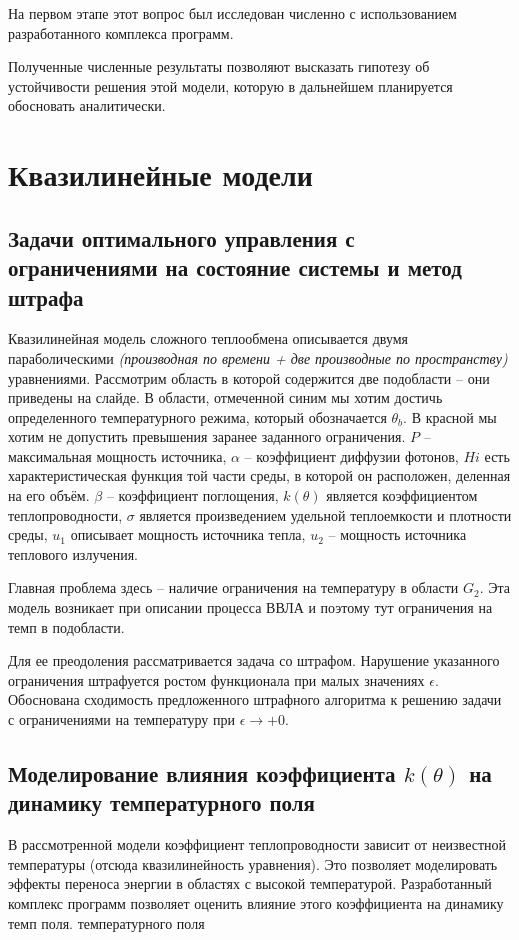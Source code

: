 \documentclass[8pt,a4paper]{article}
\begin{document}
    На первом этапе этот вопрос был исследован численно с использованием
    разработанного комплекса программ.

    Полученные численные результаты позволяют высказать гипотезу
    об устойчивости решения этой модели, которую в дальнейшем планируется обосновать аналитически.


    \section*{Квазилинейные модели}
    \subsection*{Задачи оптимального управления с ограничениями на состояние системы и метод штрафа}
    Квазилинейная модель сложного теплообмена описывается двумя параболическими
    \textit{(производная по времени + две производные по пространству)} уравнениями.
    Рассмотрим область в которой содержится две подобласти -- они приведены на слайде.
    В области, отмеченной синим мы хотим достичь определенного температурного режима, который обозначается $\theta_b$.
    В красной мы хотим не допустить превышения заранее заданного ограничения.
    $P$ – максимальная мощность источника,
    $\alpha$ – коэффициент диффузии фотонов,
    $Hi$ есть характеристическая функция той части среды, в которой он расположен, деленная на его объём.
    $\beta$ – коэффициент поглощения, $k(\theta)$ является коэффициентом теплопроводности,
    $\sigma$ является произведением удельной теплоемкости и плотности среды,
    $u_1$ описывает мощность источника тепла,
    $u_2$ – мощность источника теплового излучения.

    Главная проблема здесь -- наличие ограничения на температуру в области $G_2$.
    Эта модель возникает при описании процесса ВВЛА и поэтому тут ограничения на темп в подобласти.

    Для ее преодоления рассматривается задача со штрафом.
    Нарушение указанного ограничения штрафуется ростом функционала при малых значениях $\epsilon$.
    Обоснована сходимость предложенного штрафного алгоритма к решению задачи
    с ограничениями на температуру при $\epsilon\to+0$.


    \subsection*{Моделирование влияния коэффициента $k(\theta)$ на динамику температурного поля}
    В рассмотренной модели коэффициент теплопроводности зависит от
    неизвестной температуры (отсюда квазилинейность уравнения).
    Это позволяет моделировать эффекты переноса энергии в
    областях с высокой температурой.
    Разработанный комплекс программ позволяет оценить
    влияние этого коэффициента на динамику темп поля.
    температурного поля
\end{document}
